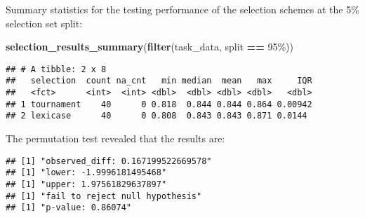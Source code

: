 \documentclass[
]{book}
\newenvironment{Shaded}{\begin{snugshade}}{\end{snugshade}}
\newcommand{\AttributeTok}[1]{\textcolor[rgb]{0.13,0.29,0.53}{#1}}
\newcommand{\DecValTok}[1]{\textcolor[rgb]{0.00,0.00,0.81}{#1}}
\newcommand{\FunctionTok}[1]{\textcolor[rgb]{0.13,0.29,0.53}{\textbf{#1}}}
\newcommand{\NormalTok}[1]{#1}
\newcommand{\OtherTok}[1]{\textcolor[rgb]{0.56,0.35,0.01}{#1}}
\newcommand{\SpecialCharTok}[1]{\textcolor[rgb]{0.81,0.36,0.00}{\textbf{#1}}}
\newcommand{\StringTok}[1]{\textcolor[rgb]{0.31,0.60,0.02}{#1}}
\begin{document}
Summary statistics for the testing performance of the selection schemes at the 5\% selection set split:

\begin{Shaded}
\begin{Highlighting}[]
\FunctionTok{selection\_results\_summary}\NormalTok{(}\FunctionTok{filter}\NormalTok{(task\_data, split }\SpecialCharTok{==} \StringTok{\textquotesingle{}95\%\textquotesingle{}}\NormalTok{))}
\end{Highlighting}
\end{Shaded}

\begin{verbatim}
## # A tibble: 2 x 8
##   selection  count na_cnt   min median  mean   max     IQR
##   <fct>      <int>  <int> <dbl>  <dbl> <dbl> <dbl>   <dbl>
## 1 tournament    40      0 0.818  0.844 0.844 0.864 0.00942
## 2 lexicase      40      0 0.808  0.843 0.843 0.871 0.0144
\end{verbatim}

The permutation test revealed that the results are:

\begin{Shaded}
\end{Shaded}

\begin{verbatim}
## [1] "observed_diff: 0.167199522669578"
## [1] "lower: -1.9996181495468"
## [1] "upper: 1.97561829637897"
## [1] "fail to reject null hypothesis"
## [1] "p-value: 0.86074"
\end{verbatim}
\end{document}
